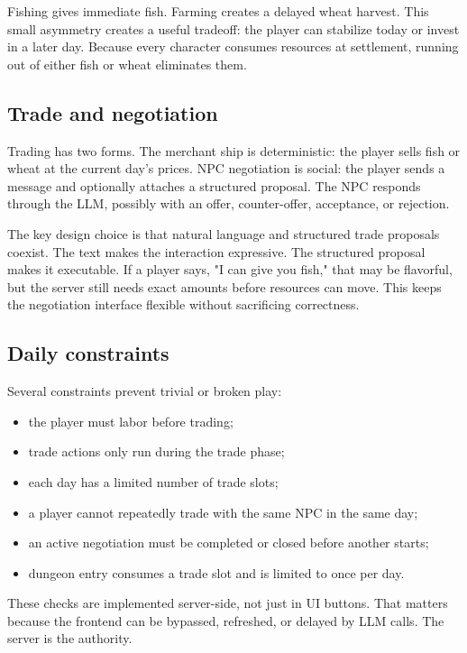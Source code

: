 \documentclass[11pt]{article}
\begin{document}
Fishing gives immediate fish. Farming creates a delayed wheat harvest. This
small asymmetry creates a useful tradeoff: the player can stabilize today or
invest in a later day. Because every character consumes resources at settlement,
running out of either fish or wheat eliminates them.

\subsection{Trade and negotiation}

Trading has two forms. The merchant ship is deterministic: the player sells fish
or wheat at the current day's prices. NPC negotiation is social: the player sends
a message and optionally attaches a structured proposal. The NPC responds
through the LLM, possibly with an offer, counter-offer, acceptance, or rejection.

The key design choice is that natural language and structured trade proposals
coexist. The text makes the interaction expressive. The structured proposal
makes it executable. If a player says, "I can give you fish," that may be
flavorful, but the server still needs exact amounts before resources can move.
This keeps the negotiation interface flexible without sacrificing correctness.

\subsection{Daily constraints}

Several constraints prevent trivial or broken play:

\begin{itemize}
  \item the player must labor before trading;
  \item trade actions only run during the trade phase;
  \item each day has a limited number of trade slots;
  \item a player cannot repeatedly trade with the same NPC in the same day;
  \item an active negotiation must be completed or closed before another starts;
  \item dungeon entry consumes a trade slot and is limited to once per day.
\end{itemize}

These checks are implemented server-side, not just in UI buttons. That matters
because the frontend can be bypassed, refreshed, or delayed by LLM calls. The
server is the authority.
\end{document}
